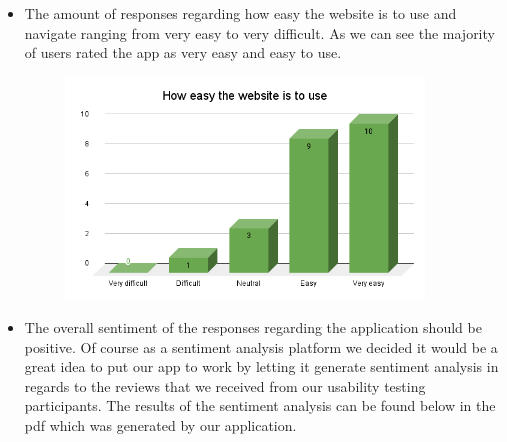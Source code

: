 \documentclass[12pt]{article}
\begin{document}
\begin{itemize}
\begin{itemize}
\begin{figure}[H]
                    \end{figure}
              \item The amount of responses regarding how easy the website is to use and navigate ranging from very easy to very difficult. As we can see the majority of users rated the app as very easy and easy to use.
                    \begin{figure}[H]
                        \centering
                        \includegraphics[width=0.9\textwidth]{How easy the website is to use.png}
                    \end{figure}
              \item The overall sentiment of the responses regarding the application should be positive. Of course as a sentiment analysis platform we decided it would be a great idea to put our app to work by letting it generate sentiment analysis in regards to the reviews that we received from our usability testing participants. The results of the sentiment analysis can be found below in the pdf which was generated by our application.
                    


\end{itemize}
\end{itemize}
\end{document}
